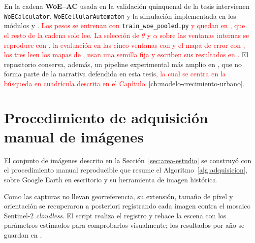 En la cadena \textbf{WoE--AC} usada en la validación quinquenal de la tesis intervienen \texttt{WoE\allowbreak Calculator}, \texttt{WoE\allowbreak Cellular\allowbreak Automaton} y la simulación implementada en los módulos  y . \textcolor{red}{Los pesos se entrenan con} \texttt{train\_woe\_pooled.py} \textcolor{red}{y quedan en} \textcolor{red}{, que el resto de la cadena solo lee. La selección de $\theta$ y $\alpha$ sobre las ventanas internas se reproduce con} \textcolor{red}{, la evaluación en las cinco ventanas con}  \textcolor{red}{y el mapa de error con} \textcolor{red}{; los tres leen los mapas de} \textcolor{red}{, usan una semilla fija y escriben sus resultados en} \textcolor{red}{.} El repositorio conserva, además, un pipeline experimental más amplio en , que no forma parte de la narrativa defendida en esta tesis\textcolor{red}{, la cual se centra en la búsqueda en cuadrícula descrita en el Capítulo~\ref{ch:modelo-crecimiento-urbano}.}

\section{Procedimiento de adquisición manual de imágenes}

El conjunto de imágenes descrito en la Sección~\ref{sec:area-estudio} se construyó con el procedimiento manual reproducible que resume el Algoritmo~\ref{alg:adquisicion}, sobre Google Earth en escritorio y su herramienta de imagen histórica.

Como las capturas no llevan georreferencia, su extensión, tamaño de píxel y orientación se recuperaron a posteriori registrando cada imagen contra el mosaico Sentinel-2 \textit{cloudless}. El script  realiza el registro y  rehace la escena con los parámetros estimados para comprobarlos visualmente; los resultados por año se guardan en .

